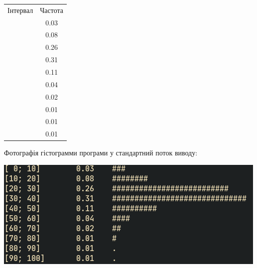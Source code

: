 \documentclass[a4paper,12pt]{report}
\begin{document}
\begin{table}[ht]
\centering %
\begin{tabular}{c c} %
  Інтервал & Частота \\\relax
[ 0; 10] & 0.03 \\\relax
[10; 20] & 0.08 \\\relax
[20; 30] & 0.26 \\\relax
[30; 40] & 0.31 \\\relax
[40; 50] & 0.11 \\\relax
[50; 60] & 0.04 \\\relax
[60; 70] & 0.02 \\\relax
[70; 80] & 0.01 \\\relax
[80; 90] & 0.01 \\\relax
[90; 100] & 0.01
\end{tabular}
\end{table}
Фотографія гістограмми програми у стандартний поток виводу:
\begin{center}\includegraphics[scale=0.5]{arens}\end{center}
\end{document}

